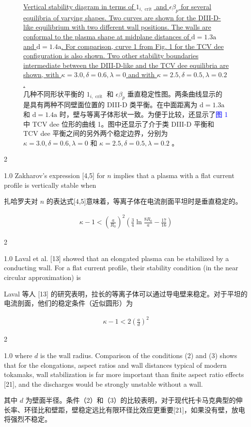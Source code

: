 \documentclass[utf8]{ctexart}
\newcommand\enzhbox[2]{
  	\quad\par \begin{paracol}{2} \colseprulecolor{black} 
  		\begin{spacing}{1.0}
  			\footnotesize  #1
  		\end{spacing}
  		\switchcolumn[1] 
  		#2
  	\end{paracol} \quad\par
  }
\begin{document}
\begin{sloppypar}
\begin{figure}[H]
 \caption{\uline{Vertical stability diagram in terms of $1_{i, \text { crit }}$ and $\epsilon \beta_{p}$ for several equilibria of varying shapes. Two curves are shown for the DIII-D-like equilibrium with two different wall positions. The walls are conformal to the plasma shape at midplane distances of $\mathrm{d}=1.3 \mathrm{a}$ and $\mathrm{d}=1.4 \mathrm{a}$. For comparison, curve 1 from Fig. 1 for the TCV dee configuration is also shown. Two other stability boundaries intermediate between the DIII-D-like and the TCV dee equilibria are shown, with $\kappa=3.0, \delta=0.6, \lambda=0$ and with $\kappa=2.5, \delta=0.5, \lambda=0.2$.}\\几种不同形状平衡的 $1_{i, \text { crit }}$  和 $\epsilon \beta_{p}$  垂直稳定性图。两条曲线显示的是具有两种不同壁面位置的 DIII-D 类平衡。在中面距离为 $\mathrm{d}=1.3 \mathrm{a}$  和 $\mathrm{d}=1.4 \mathrm{a}$ 时，壁与等离子体形状一致。为便于比较，还显示了\textcolor{blue}{图 1} 中 TCV dee 位形的曲线 1。图中还显示了介于类 DIII-D 平衡和 TCV dee 平衡之间的另外两个稳定边界，分别为 $\kappa=3.0, \delta=0.6, \lambda=0$  和 $\kappa=2.5, \delta=0.5, \lambda=0.2$ 。}
  	\label{fig3.}
  \end{figure}
  
   
  
 
\enzhbox{  Zakharov's expression \textcolor{green!50!black}{[4,5]} for $n$ implies that a plasma with a flat current profile is vertically stable when\\}{
扎哈罗夫对 $n$  的表达式\textcolor{green!50!black}{[4,5]}意味着，等离子体在电流剖面平坦时是垂直稳定的。}
 \begin{align*}
 	 \kappa-1<\left(\frac{a}{R_{0}}\right)^{2}\left(\frac{3}{4} \ln \frac{8 R_{0}}{a}-\frac{17}{16}\right) \tag{2}
 \end{align*}
 
\enzhbox{  Laval et al. \textcolor{green!50!black}{[13]} showed that an elongated plasma can be stabilized by a conducting wall. For a flat current profile, their stability condition (in the near circular approximation) is\\}{
Laval 等人 \textcolor{green!50!black}{[13]} 的研究表明，拉长的等离子体可以通过导电壁来稳定。对于平坦的电流剖面，他们的稳定条件（近似圆形）为}
  
 \begin{align*}
 	 \kappa-1<2\left(\frac{a}{d}\right)^{2} \tag{3}
 \end{align*}
  
 
\enzhbox{  \noindent where $d$ is the wall radius. Comparison of the conditions (2) and (3) shows that for the elongations, aspect ratios and wall distances typical of modern tokamaks, wall stabilization is far more important than finite aspect ratio effects \textcolor{green!50!black}{[21]}, and the discharges would be strongly unstable without a wall.}{
\noindent 其中 $d$  为壁面半径。条件（2）和（3）的比较表明，对于现代托卡马克典型的伸长率、环径比和壁距，壁稳定远比有限环径比效应更重要\textcolor{green!50!black}{[21]}，如果没有壁，放电将强烈不稳定。}
  

\end{sloppypar}
\end{document}
